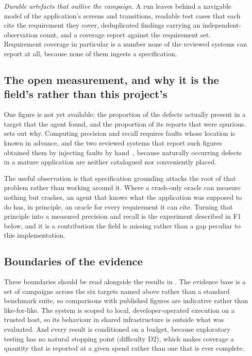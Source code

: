 \emph{Durable artefacts that outlive the campaign.} A run leaves behind a
navigable model of the application's screens and transitions, readable test
cases that each cite the requirement they cover, deduplicated findings carrying
an independent-observation count, and a coverage report against the requirement
set. Requirement coverage in particular is a number none of the reviewed systems
can report at all, because none of them ingests a specification.

\subsection*{The open measurement, and why it is the field's rather than this
project's}

One figure is not yet available: the proportion of the defects actually present
in a target that the agent found, and the proportion of its reports that were
spurious.  sets out why. Computing precision and recall
requires faults whose location is known in advance, and the two reviewed systems
that report such figures obtained them by injecting faults by
hand~\cite{auitestagent}, because naturally occurring defects in a mature
application are neither catalogued nor conveniently placed.

The useful observation is that specification grounding attacks the root of that
problem rather than working around it. Where a crash-only oracle can measure
nothing but crashes, an agent that knows what the application was supposed to do
has, in principle, an oracle for every requirement it can cite. Turning that
principle into a measured precision and recall is the experiment described in F1
below, and it is a contribution the field is missing rather than a gap peculiar
to this implementation.

\subsection*{Boundaries of the evidence}

Three boundaries should be read alongside the results in .
The evidence base is a set of campaigns across the six targets named above
rather than a standard benchmark suite, so comparisons with published figures
are indicative rather than like-for-like. The system is scoped to local,
developer-operated execution on a trusted host, so its behaviour in shared
infrastructure is outside what was evaluated. And every result is conditioned on
a budget, because exploratory testing has no natural stopping point
(difficulty D2), which makes coverage a quantity that is reported at a given
spend rather than one that is ever complete.

